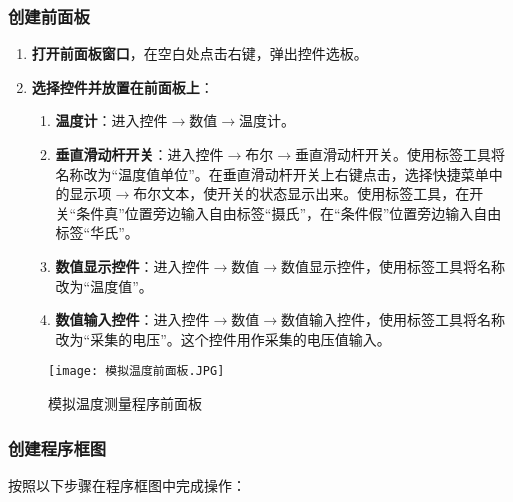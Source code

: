 \documentclass[UTF-8,twoside,cs4size]{ctexart}
\begin{document}
    \subsubsection{创建前面板}
    \begin{enumerate}
        \item \textbf{打开前面板窗口}，在空白处点击右键，弹出控件选板。
        
        \item \textbf{选择控件并放置在前面板上}：
        \begin{enumerate}
            \item \textbf{温度计}：进入控件$\rightarrow$数值$\rightarrow$温度计。
            \item \textbf{垂直滑动杆开关}：进入控件$\rightarrow$布尔$\rightarrow$垂直滑动杆开关。使用标签工具将名称改为“温度值单位”。在垂直滑动杆开关上右键点击，选择快捷菜单中的显示项$\rightarrow$布尔文本，使开关的状态显示出来。使用标签工具，在开关“条件真”位置旁边输入自由标签“摄氏”，在“条件假”位置旁边输入自由标签“华氏”。
            \item \textbf{数值显示控件}：进入控件$\rightarrow$数值$\rightarrow$数值显示控件，使用标签工具将名称改为“温度值”。
            \item \textbf{数值输入控件}：进入控件$\rightarrow$数值$\rightarrow$数值输入控件，使用标签工具将名称改为“采集的电压”。这个控件用作采集的电压值输入。
        \end{enumerate}
    \end{enumerate}
    \begin{figure}[!h]
        \centering
        \texttt{[image: 模拟温度前面板.JPG]}
        \caption{模拟温度测量程序前面板}
    \end{figure}
    \subsubsection{创建程序框图}
    按照以下步骤在程序框图中完成操作：
\end{document}

